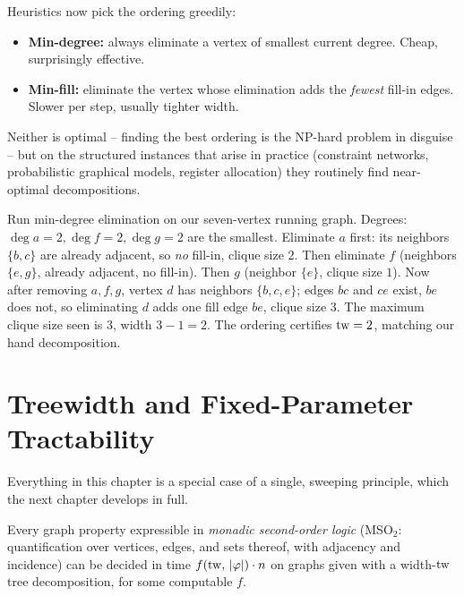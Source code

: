 Heuristics now pick the ordering greedily:

\begin{itemize}
  \item \textbf{Min-degree:} always eliminate a vertex of smallest current degree.
        Cheap, surprisingly effective.
  \item \textbf{Min-fill:} eliminate the vertex whose elimination adds the
        \emph{fewest} fill-in edges. Slower per step, usually tighter width.
\end{itemize}

Neither is optimal -- finding the best ordering is the NP-hard problem in
disguise -- but on the structured instances that arise in practice (constraint
networks, probabilistic graphical models, register allocation) they routinely find
near-optimal decompositions.

\begin{labbox}
Run min-degree elimination on our seven-vertex running graph. Degrees: $\deg a=2,
\deg f=2, \deg g=2$ are the smallest. Eliminate $a$ first: its neighbors $\{b,c\}$
are already adjacent, so \emph{no} fill-in, clique size $2$. Then eliminate $f$
(neighbors $\{e,g\}$, already adjacent, no fill-in). Then $g$ (neighbor $\{e\}$,
clique size $1$). Now after removing $a,f,g$, vertex $d$ has neighbors $\{b,c,e\}$;
edges $bc$ and $ce$ exist, $be$ does not, so eliminating $d$ adds one fill edge
$be$, clique size $3$. The maximum clique size seen is $3$, width $3-1=2$. The
ordering certifies $\operatorname{tw}=2$, matching our hand decomposition.
\end{labbox}

\section{Treewidth and Fixed-Parameter Tractability}
\label{ch24:fpt}

Everything in this chapter is a special case of a single, sweeping principle,
which the next chapter develops in full.

\begin{theorem}[Courcelle, 1990]
\label{ch24:thm-courcelle}
Every graph property expressible in \emph{monadic second-order logic} (MSO$_2$:
quantification over vertices, edges, and sets thereof, with adjacency and
incidence) can be decided in time $f(\operatorname{tw},\,\lvert\varphi\rvert)\cdot n$ on graphs given
with a width-$\operatorname{tw}$ tree decomposition, for some computable $f$.
\end{theorem}

